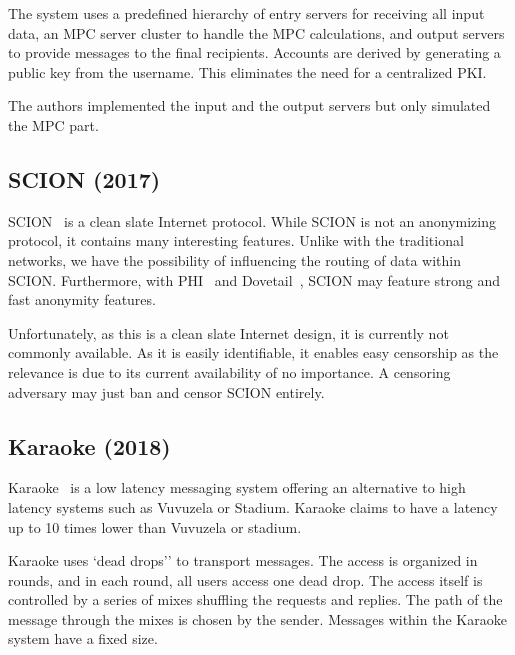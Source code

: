 The system uses a predefined hierarchy of entry servers for receiving all input data, an MPC server cluster to handle the MPC calculations, and output servers to provide messages to the final recipients. Accounts are derived by generating a public key from the username. This eliminates the need for a centralized PKI. 

The authors implemented the input and the output servers but only simulated the MPC part.

%

%
%

\subsection{SCION (2017)}
SCION~\cite{perrig2017scion} is a clean slate Internet protocol. While SCION is not an anonymizing protocol, it contains many interesting features. Unlike with the traditional networks, we have the possibility of influencing the routing of data within SCION. Furthermore, with PHI~\cite{chen2017phi} and Dovetail~\cite{sankey2014dovetail}, SCION may feature strong and fast anonymity features. 

Unfortunately, as this is a clean slate Internet design, it is currently not commonly available. As it is easily identifiable, it enables easy censorship as the relevance is due to its current availability of no importance. A censoring adversary may just ban and censor SCION entirely. 

\subsection{Karaoke (2018)}
Karaoke~\cite{lazar2018karaoke} is a low latency messaging system offering an alternative to high latency systems such as Vuvuzela or Stadium. Karaoke claims to have a latency up to 10 times lower than Vuvuzela or stadium. 

Karaoke uses `dead drops'' to transport messages. The access is organized in rounds, and in each round, all users access one dead drop. The access itself is controlled by a series of mixes shuffling the requests and replies. The path of the message through the mixes is chosen by the sender. Messages within the Karaoke system have a fixed size.


